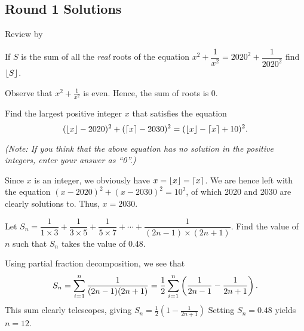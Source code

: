 \subsection{Round 1 Solutions}\label{S::2020-O-1}

\begin{resources}
    Review by 
\end{resources}

\begin{question}[0]\label{A::2020-O-1-1}
    If $S$ is the sum of all the \textit{real} roots of the equation $x^2 + \dfrac{1}{x^2} = 2020^2 + \dfrac{1}{2020^2}$ find $\left\lfloor S \right\rfloor$.
\end{question}
\begin{solution*}
    Observe that $x^2 + \frac1{x^2}$ is even. Hence, the sum of roots is 0.
\end{solution*}

\begin{question}[2030]\label{A::2020-O-1-2}
    Find the largest positive integer $x$ that satisfies the equation \[(\left\lfloor x \right\rfloor - 2020)^2 + (\left\lceil x \right\rceil - 2030)^2 = (\left\lfloor x \right\rfloor - \left\lceil x \right\rceil + 10)^2.\]

    \noindent\textit{(Note: If you think that the above equation has no solution in the positive integers, enter your answer as ``0''.)}
\end{question}
\begin{solution*}
    Since $x$ is an integer, we obviously have $x = \left\lfloor x \right\rfloor = \left\lceil x \right\rceil$. We are hence left with the equation $(x - 2020)^2 + (x - 2030)^2 = 10^2$, of which 2020 and 2030 are clearly solutions to. Thus, $x = 2030$.
\end{solution*}

\begin{question}[12]\label{A::2020-O-1-3}
    Let $S_n = \dfrac1{1 \times 3} + \dfrac{1}{3 \times 5} + \dfrac1{5 \times 7} + \cdots + \dfrac{1}{(2n-1) \times (2n+1)}$. Find the value of $n$ such that $S_n$ takes the value of 0.48.
\end{question}
\begin{solution*}
    Using partial fraction decomposition, we see that \[S_n = \sum_{i = 1}^{n} \frac{1}{(2n-1)(2n+1)} = \frac12 \sum_{i = 1}^n \left( \frac{1}{2n-1} - \frac{1}{2n+1} \right).\] This sum clearly telescopes, giving $S_n = \frac12 (1 - \frac{1}{2n + 1})$ Setting $S_n = 0.48$ yields $n = 12$.
\end{solution*}

